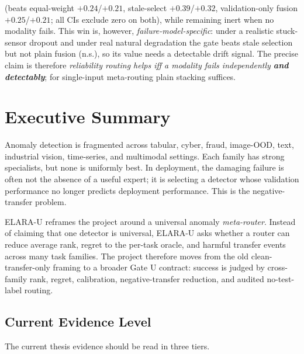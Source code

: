 \documentclass[11pt,titlepage]{article}
\newcommand{\systemu}{ELARA-U}
\newcommand{\gateu}{Gate U}
\begin{document}
\begin{titlepage}
\begin{minipage}{0.86\linewidth}
(beats equal-weight $+0.24$/$+0.21$, stale-select $+0.39$/$+0.32$, validation-only
fusion $+0.25$/$+0.21$; all CIs exclude zero on both), while remaining inert when no
modality fails. This win is, however, \emph{failure-model-specific}: under a realistic
stuck-sensor dropout and under real natural degradation the gate beats stale selection
but not plain fusion (n.s.), so its value needs a detectable drift signal. The precise
claim is therefore \emph{reliability routing helps iff a modality fails independently
\textbf{and detectably}}; for single-input meta-routing plain stacking suffices.
\end{minipage}
\end{titlepage}

\tableofcontents
\listoftables
\listoffigures
\newpage

\section{Executive Summary}

Anomaly detection is fragmented across tabular, cyber, fraud, image-OOD, text,
industrial vision, time-series, and multimodal settings. Each family has strong
specialists, but none is uniformly best. In deployment, the damaging failure is
often not the absence of a useful expert; it is selecting a detector whose
validation performance no longer predicts deployment performance. This is the
negative-transfer problem.

\systemu{} reframes the project around a universal anomaly \emph{meta-router}.
Instead of claiming that one detector is universal, \systemu{} asks whether a
router can reduce average rank, regret to the per-task oracle, and harmful
transfer events across many task families. The project therefore moves from the
old clean-transfer-only framing to a broader \gateu{} contract: success is judged
by cross-family rank, regret, calibration, negative-transfer reduction, and
audited no-test-label routing.

\subsection{Current Evidence Level}

The current thesis evidence should be read in three tiers.
\end{document}
